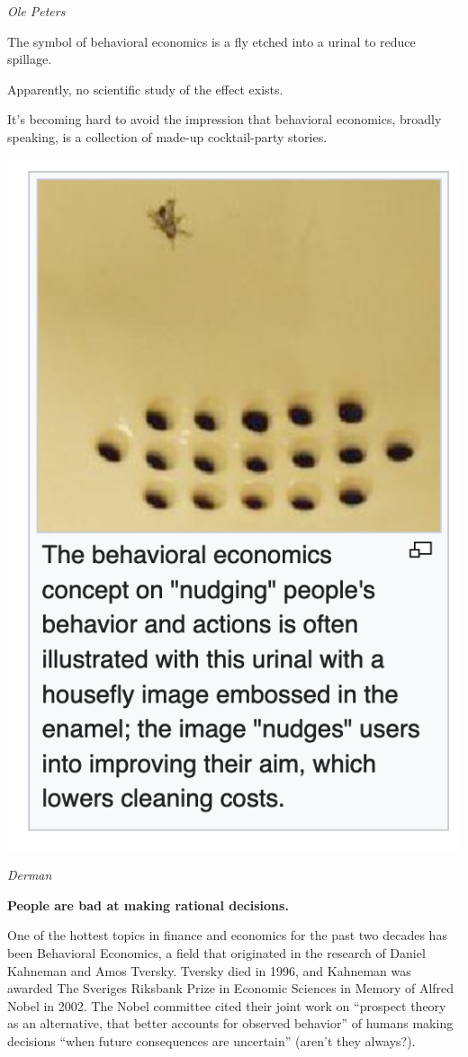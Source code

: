 \documentclass[
]{book}
\begin{document}
\emph{Ole Peters}

The symbol of behavioral economics is a fly etched into a urinal to reduce spillage.

Apparently, no scientific study of the effect exists.

It's becoming hard to avoid the impression that behavioral economics, broadly speaking, is a collection of made-up cocktail-party stories.

\includegraphics{fig/behavioural_urinal.png}

\emph{Derman}

\textbf{People are bad at making rational decisions.}

One of the hottest topics in finance and economics for the past two decades has been Behavioral
Economics, a field that originated in the research of Daniel Kahneman and Amos Tversky.
Tversky died in 1996, and Kahneman was awarded The Sveriges Riksbank Prize in Economic
Sciences in Memory of Alfred Nobel in 2002. The Nobel committee cited their joint work on
``prospect theory as an alternative, that better accounts for observed behavior'' of humans making
decisions ``when future consequences are uncertain'' (aren't they always?).
\end{document}
